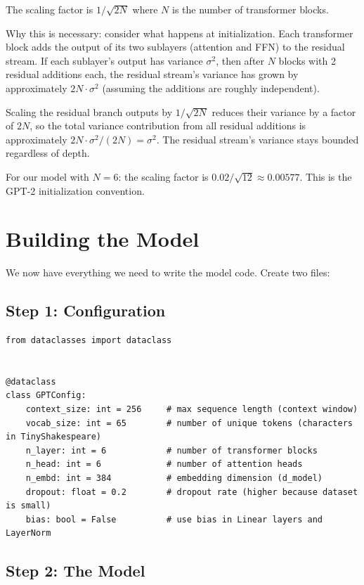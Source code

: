 The scaling factor is $1 / \sqrt{2N}$ where $N$ is the number of transformer blocks.

Why this is necessary: consider what happens at initialization. Each transformer block adds the output of its two sublayers (attention and FFN) to the residual stream. If each sublayer's output has variance $\sigma^2$, then after $N$ blocks with 2 residual additions each, the residual stream's variance has grown by approximately $2N \cdot \sigma^2$ (assuming the additions are roughly independent).

Scaling the residual branch outputs by $1/\sqrt{2N}$ reduces their variance by a factor of $2N$, so the total variance contribution from all residual additions is approximately $2N \cdot \sigma^2 / (2N) = \sigma^2$. The residual stream's variance stays bounded regardless of depth.

For our model with $N = 6$: the scaling factor is $0.02 / \sqrt{12} \approx 0.00577$. This is the GPT-2 initialization convention.

\section{Building the Model}

We now have everything we need to write the model code. Create two files:

\subsection{Step 1: Configuration}

\begin{lstlisting}
from dataclasses import dataclass


@dataclass
class GPTConfig:
    context_size: int = 256     # max sequence length (context window)
    vocab_size: int = 65        # number of unique tokens (characters in TinyShakespeare)
    n_layer: int = 6            # number of transformer blocks
    n_head: int = 6             # number of attention heads
    n_embd: int = 384           # embedding dimension (d_model)
    dropout: float = 0.2        # dropout rate (higher because dataset is small)
    bias: bool = False          # use bias in Linear layers and LayerNorm
\end{lstlisting}

\subsection{Step 2: The Model}

